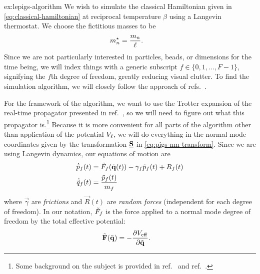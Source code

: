 \begin{DefAnswer}{ex:lepigs-algorithm}
	We wish to simulate the classical Hamiltonian given in \vref{eq:classical-hamiltonian} at reciprocal temperature $\beta$ using a Langevin thermostat.
	We choose the fictitious masses to be
	\begin{align}
		{m}^\star_n
		&= \frac{m_n}{\ell}.
	\end{align}
	Since we are not particularly interested in particles, beads, or dimensions for the time being, we will index things with a generic subscript $f \in \{ 0, 1, \ldots, F - 1 \}$, signifying the $f$th degree of freedom, greatly reducing visual clutter.
	To find the simulation algorithm, we will closely follow the approach of refs.~\cite{bussi2007accurate,ceriotti2010efficient}.

	For the framework of the algorithm, we want to use the Trotter expansion of the real-time propagator presented in ref.~\cite{tuckerman1992reversible}, so we will need to figure out what this propagator is.\footnote{
		Some background on the subject is provided in ref.~\cite[44-50]{evans2008statistical} and ref.~\cite[31-35]{zwanzig2001nonequilibrium}.
	}
	Because it is more convenient for all parts of the algorithm other than application of the potential $V_\ell$, we will do everything in the normal mode coordinates given by the transformation $\underline{\bm{\mathbf{S}}}$ in \vref{eq:pigs-nm-transform}.
	Since we are using Langevin dynamics, our equations of motion are~\cite{kubo1966fluctuation}
	\begin{subequations} \label{eq:langevin-eom}
	\begin{align}
		\dot{\tilde{p}}_f(t)
		&= \tilde{F}_f(\tilde{\bm{\mathbf{q}}}(t)) - \gamma_f \tilde{p}_f(t) + R_f(t)
			\label{eq:langevin-eom-p} \\
		\dot{\tilde{q}}_f(t)
		&= \frac{\tilde{p}_f(t)}{m_f}
	\end{align}
	\end{subequations}
	where $\vec{\gamma}$ are \emph{frictions} and $\vec{R}(t)$ are \emph{random forces} (independent for each degree of freedom).
	In our notation, $\tilde{F}_f$ is the force applied to a normal mode degree of freedom by the total effective potential:
	\begin{align}
		\tilde{\bm{\mathbf{F}}}(\tilde{\bm{\mathbf{q}}})
		&= -\frac{\partial V_\mathrm{eff}}{\partial \tilde{\bm{\mathbf{q}}}}.
	\end{align}


\end{DefAnswer}
